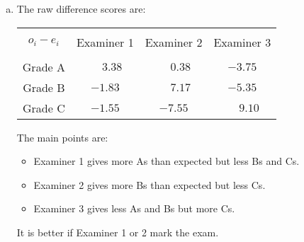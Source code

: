 \documentclass[12pt]{article}
\newcommand{\m}{\phantom{-}}
\begin{document}
{\begin{minipage}[t]{0.98\textwidth}
\begin{enumerate}[a)]
$\Rightarrow$ $\chi^2 = \sum \frac{(o_i-e_i)^2}{e_i} = 11.77$.\\[0.5cm]
Note that $\nu = (n_r-1)\times(n_c-1) = (3-1)(3-1) = (2)(2) = 4$ and $\alpha = 0.05$ $\Rightarrow$ $\chi^2_{\,4,\,0.05} = 9.488$.\\[0.5cm]
The test statistic $\chi^2 = 11.77$ lies above the critical value $\chi^2_{\,4,\,0.05} = 9.488$ and, hence, we reject the hypothesis that there is no relationship between the two variables.\\[0.5cm]
Conclusion: The grade awarded depends on the specific examiner.
\item The raw difference scores are:
\begin{center}
\begin{tabular}{|c|ccc|}
\hline
&&&\\[-0.3cm]
$o_i-e_i$    & Examiner 1 & Examiner 2 & Examiner 3 \\[0.1cm]
\hline
&&&\\[-0.3cm]
Grade A     & $\m3.38$   &  $\m0.38$    & $-3.75$     \\[0.2cm]
Grade B     & $-1.83$    &  $\m7.17$    & $-5.35$     \\[0.2cm]
Grade C     & $-1.55$    &  $-7.55$     & $\m9.10$     \\[0.1cm]
\hline
\end{tabular}
\end{center}
The main points are:
\begin{itemize}\itemsep0.3cm
\item Examiner 1 gives more As than expected but less Bs and Cs.
\item Examiner 2 gives more Bs than expected but less Cs.
\item Examiner 3 gives less As and Bs but more Cs.\\[-0.1cm]
\end{itemize}
It is better if Examiner 1 or 2 mark the exam.\\
\end{enumerate}
\end{minipage}}\vspace{0.03\textwidth}
\end{document}
